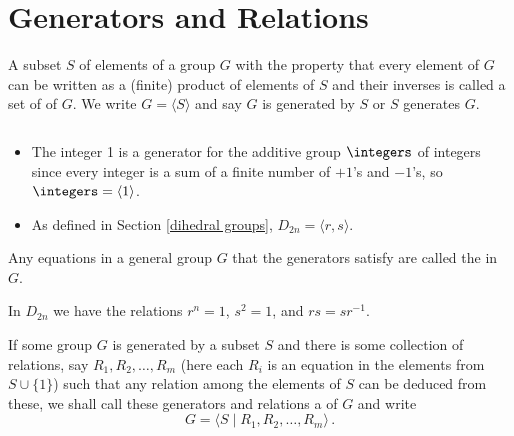 
\newpage 

\section{Generators and Relations}\label{generators and relations}

\begin{definition}[Generators]
	A subset $S$ of elements of a group $G$ with the property that 
	every element of $G$ can be written as a (finite) product of 
	elements of $S$ and their inverses is called a set of 
	 of $G$. We 
	write $G = \langle S \rangle$ and say $G$ is generated by $S$ 
	or $S$ generates $G$.
\end{definition}

\begin{example}
	$ $
	\begin{itemize}
		\item The integer 1 is a generator for the additive group 
		$\integers$ of integers since every integer is a sum of a 
		finite number of $+1$'s and $-1$'s, so $\integers = \langle 
		1 \rangle$.
		
		\item As defined in Section \ref{dihedral groups}, $D_{2n} 
		= \langle r, s \rangle$.
	\end{itemize}
\end{example}

\begin{definition}
	Any equations in a general group $G$ that the generators 
	satisfy are called the  in $G$.
\end{definition}

\begin{example}
	In $D_{2n}$ we have the relations $r^n = 1$, $s^2 = 1$, and $rs 
	= sr^{-1}$.
\end{example}

If some group $G$ is generated by a subset $S$ and there is some 
collection of relations, say $R_1, R_2, \dots, R_m$ (here each 
$R_i$ is an equation in the elements from $S \cup \{ 1 \}$) such 
that any relation among the elements of $S$ can be deduced from 
these, we shall call these generators and relations a 
 of $G$ and write
\[
	G = \langle S \mid R_1, R_2, \dots, R_m \rangle\,.
\]

